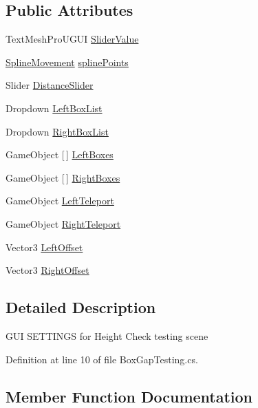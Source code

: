 \subsection*{Public Attributes}
\begin{DoxyCompactItemize}
\item 
Text\+Mesh\+Pro\+U\+G\+UI \mbox{\hyperlink{class_box_gap_testing_a95f91ad63ea1f94627d347064bd40016}{Slider\+Value}}
\item 
\mbox{\hyperlink{class_spline_movement}{Spline\+Movement}} \mbox{\hyperlink{class_box_gap_testing_a7d1c8565eb1f3236338e9a58a4bcc0b8}{spline\+Points}}
\item 
Slider \mbox{\hyperlink{class_box_gap_testing_a55a2167175a350189b1b97828c98345a}{Distance\+Slider}}
\item 
Dropdown \mbox{\hyperlink{class_box_gap_testing_af7c91fab5df48aa454e6ee9ab8c1aa14}{Left\+Box\+List}}
\item 
Dropdown \mbox{\hyperlink{class_box_gap_testing_ad2171b03b76be8dfbdf95608c36ff346}{Right\+Box\+List}}
\item 
Game\+Object \mbox{[}$\,$\mbox{]} \mbox{\hyperlink{class_box_gap_testing_a37c3e1b0863c79089e89dcc98828cde6}{Left\+Boxes}}
\item 
Game\+Object \mbox{[}$\,$\mbox{]} \mbox{\hyperlink{class_box_gap_testing_a112ea63f74403d79bb74d6f3769ce025}{Right\+Boxes}}
\item 
Game\+Object \mbox{\hyperlink{class_box_gap_testing_a35b8172a53ae9c7206edbc0d9dfc1345}{Left\+Teleport}}
\item 
Game\+Object \mbox{\hyperlink{class_box_gap_testing_a9a97a6a39b3a430006c2e95c545a9c9c}{Right\+Teleport}}
\item 
Vector3 \mbox{\hyperlink{class_box_gap_testing_a82b8b676f4ca0f4a5d544c7d159b0f5c}{Left\+Offset}}
\item 
Vector3 \mbox{\hyperlink{class_box_gap_testing_afbee8e29e47502e031a7068574f4bd31}{Right\+Offset}}
\end{DoxyCompactItemize}


\subsection{Detailed Description}
G\+UI S\+E\+T\+T\+I\+N\+GS for Height Check testing scene 



Definition at line 10 of file Box\+Gap\+Testing.\+cs.



\subsection{Member Function Documentation}
\mbox{\label{class_box_gap_testing_a68cba39d1388e2c57edd7bf3595574cd}} 
